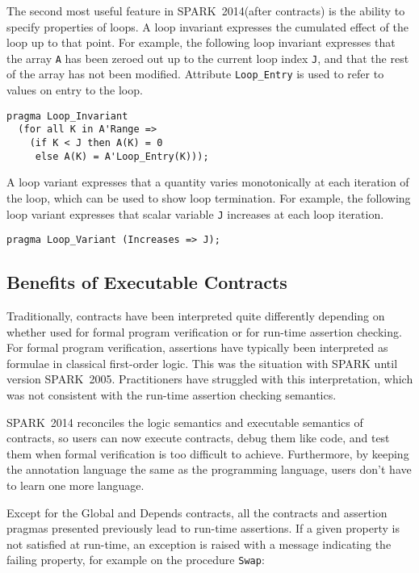 \documentclass[10pt,a4paper,twocolumn]{article}
\newcommand{\oldspark}{SPARK~2005\xspace}
\newcommand{\newspark}{SPARK~2014\xspace}
\newcommand{\SPARK}[1]{\lstinline[language=Ada,basicstyle={\footnotesize
      \sffamily},framesep=0pt]$#1$}
\begin{document}
The second most useful feature in \newspark (after contracts) is the ability to
specify properties of loops. A loop invariant expresses the cumulated effect
of the loop up to that point. For example, the following loop invariant
expresses that the array \SPARK{A} has been zeroed out up to the current loop
index \SPARK{J}, and that the rest of the array has not been modified.
Attribute \SPARK{Loop_Entry} is used to refer to values on entry to the loop.

\begin{lstlisting}
pragma Loop_Invariant
  (for all K in A'Range =>
    (if K < J then A(K) = 0
     else A(K) = A'Loop_Entry(K)));
\end{lstlisting}

A loop variant expresses that a quantity varies monotonically at each iteration
of the loop, which can be used to show loop termination. For example, the
following loop variant expresses that scalar variable \SPARK{J} increases at
each loop iteration.

\begin{lstlisting}
pragma Loop_Variant (Increases => J);
\end{lstlisting}

\subsection{Benefits of Executable Contracts}
\label{subsec:ExecutableContracts}

Traditionally, contracts have been interpreted quite differently depending on
whether used for formal program verification or for run-time assertion
checking. For formal program verification, assertions have typically been
interpreted as formulae in classical first-order logic. This was the situation
with SPARK until version \oldspark. Practitioners have struggled with this
interpretation, which was not consistent with the run-time assertion checking
semantics.\cite{tseChalin10}

\newspark reconciles the logic semantics and executable semantics of contracts,
so users can now execute contracts, debug them like code, and test them when
formal verification is too difficult to achieve. Furthermore, by keeping the
annotation language the same as the programming language, users don't have to
learn one more language.

Except for the Global and Depends contracts, all the contracts and assertion
pragmas presented previously lead to run-time assertions. If a given property
is not satisfied at run-time, an exception is raised with a message indicating
the failing property, for example on the procedure \SPARK{Swap}:
\end{document}
